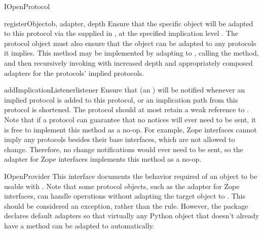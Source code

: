 \begin{verbatim%
}
\begin{verbatim%
}
\begin{verbatim%
}
\begin{verbatim%
}
\begin{verbatim%
}
\begin{verbatim%
}
\begin{classdesc*}{IOpenProtocol}
\begin{methoddesc}{registerObject}{ob, adapter, depth}
Ensure that the specific object  will be adapted to this protocol via
the  supplied in , at the specified
implication level .  The protocol object must also ensure that the
object can be adapted to any protocols it implies.  This method may be
implemented by adapting  to , calling the
 method, and then recursively invoking
 with increased depth and appropriately
composed adapters for the protocols' implied protocols.
\end{methoddesc}

\begin{methoddesc}{addImplicationListener}{listener}
Ensure that  (an ) will be notified
whenever an implied protocol is added to this protocol, or an implication path
from this protocol is shortened.  The protocol should at most retain a weak
reference to .  Note that if a protocol can guarantee that no
notices will ever need to be sent, it is free to implement this method as a
no-op.  For example, Zope interfaces cannot imply any protocols besides their
base interfaces, which are not allowed to change.  Therefore, no change
notifications would ever need to be sent, so the  adapter
for Zope interfaces implements this method as a no-op.
\end{methoddesc}



\end{classdesc*}












\begin{classdesc*}{IOpenProvider}
This interface documents the behavior required of an object to be usable with
.  Note that some protocol objects, such as the
 adapter for Zope interfaces, can handle
 operations without adapting the target object to
.  This should be considered an exception, rather than the
rule.  However, the  package declares default adapters so
that virtually any Python object that doesn't already have a
 method can be adapted to 
automatically.


\end{classdesc*}
\end{verbatim%
}
\end{verbatim%
}
\end{verbatim%
}
\end{verbatim%
}
\end{verbatim%
}
\end{verbatim%
}
